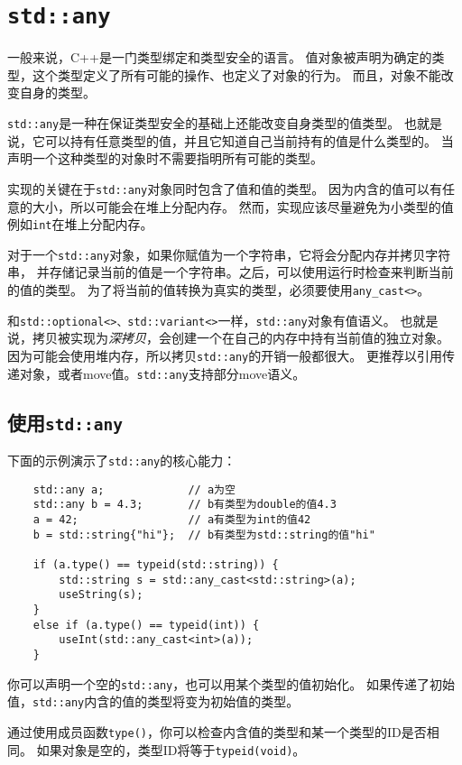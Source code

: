 \chapter{\texttt{std::any}}\label{ch17}
一般来说，C++是一门类型绑定和类型安全的语言。
值对象被声明为确定的类型，这个类型定义了所有可能的操作、也定义了对象的行为。
而且，对象不能改变自身的类型。

\texttt{std::any}是一种在保证类型安全的基础上还能改变自身类型的值类型。
也就是说，它可以持有任意类型的值，并且它知道自己当前持有的值是什么类型的。
当声明一个这种类型的对象时不需要指明所有可能的类型。

实现的关键在于\texttt{std::any}对象同时包含了值和值的类型。
因为内含的值可以有任意的大小，所以可能会在堆上分配内存。
然而，实现应该尽量避免为小类型的值例如\texttt{int}在堆上分配内存。

对于一个\texttt{std::any}对象，如果你赋值为一个字符串，它将会分配内存并拷贝字符串，
并存储记录当前的值是一个字符串。之后，可以使用运行时检查来判断当前的值的类型。
为了将当前的值转换为真实的类型，必须要使用\texttt{any\_cast<>}。

和\texttt{std::optional<>、std::variant<>}一样，\texttt{std::any}对象有值语义。
也就是说，拷贝被实现为\emph{深拷贝}，会创建一个在自己的内存中持有当前值的独立对象。
因为可能会使用堆内存，所以拷贝\texttt{std::any}的开销一般都很大。
更推荐以引用传递对象，或者move值。\texttt{std::any}支持部分move语义。


\section{使用\texttt{std::any}}
下面的示例演示了\texttt{std::any}的核心能力：
\begin{lstlisting}
    std::any a;             // a为空
    std::any b = 4.3;       // b有类型为double的值4.3
    a = 42;                 // a有类型为int的值42
    b = std::string{"hi"};  // b有类型为std::string的值"hi"

    if (a.type() == typeid(std::string)) {
        std::string s = std::any_cast<std::string>(a);
        useString(s);
    }
    else if (a.type() == typeid(int)) {
        useInt(std::any_cast<int>(a));
    }
\end{lstlisting}
你可以声明一个空的\texttt{std::any}，也可以用某个类型的值初始化。
如果传递了初始值，\texttt{std::any}内含的值的类型将变为初始值的类型。

通过使用成员函数\texttt{type()}，你可以检查内含值的类型和某一个类型的ID是否相同。
如果对象是空的，类型ID将等于\texttt{typeid(void)}。

